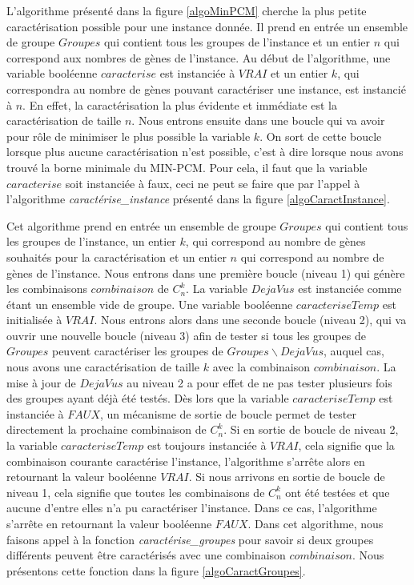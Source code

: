 L'algorithme présenté dans la figure \ref{algoMinPCM} cherche la plus petite caractérisation possible pour une instance donnée. Il prend en entrée un ensemble de groupe $Groupes$ qui contient tous les groupes de l'instance et un entier $n$ qui correspond aux nombres de gènes de l'instance. Au début de l'algorithme, une variable booléenne $caracterise$ est instanciée à $VRAI$ et un entier $k$, qui correspondra au nombre de gènes pouvant caractériser une instance, est instancié à $n$. En effet, la caractérisation la plus évidente et immédiate est la caractérisation de taille $n$. Nous entrons ensuite dans une boucle qui va avoir pour rôle de minimiser le plus possible la variable $k$. On sort de cette boucle lorsque plus aucune caractérisation n'est possible, c'est à dire lorsque nous avons trouvé la borne minimale du MIN-PCM. Pour cela, il faut que la variable $caracterise$ soit instanciée à faux, ceci ne peut se faire que par l'appel à l'algorithme \emph{caractérise\_instance} présenté dans la figure \ref{algoCaractInstance}.


Cet algorithme prend en entrée un ensemble de groupe $Groupes$ qui contient tous les groupes de l'instance, un entier $k$, qui correspond au nombre de gènes souhaités pour la caractérisation et un entier $n$ qui correspond au nombre de gènes de l'instance. Nous entrons dans une première boucle (niveau 1) qui génère les combinaisons $combinaison$ de $C_n^k$. La variable $DejaVus$ est instanciée comme étant un ensemble vide de groupe. Une variable booléenne $caracteriseTemp$ est initialisée à $VRAI$. Nous entrons alors dans une seconde boucle (niveau 2), qui va ouvrir une nouvelle boucle (niveau 3) afin de tester si tous les groupes de $Groupes$ peuvent caractériser les groupes de $Groupes \backslash DejaVus$, auquel cas, nous avons une caractérisation de taille $k$ avec la combinaison $combinaison$. La mise à jour de $DejaVus$ au niveau 2 a pour effet de ne pas tester plusieurs fois des groupes ayant déjà été testés. Dès lors que la variable $caracteriseTemp$ est instanciée à $FAUX$, un mécanisme de sortie de boucle permet de tester directement la prochaine combinaison de $C_n^k$. Si en sortie de boucle de niveau 2, la variable $caracteriseTemp$ est toujours instanciée à $VRAI$, cela signifie que la combinaison courante caractérise l'instance, l'algorithme s'arrête alors en retournant la valeur booléenne $VRAI$. Si nous arrivons en sortie de boucle de niveau 1, cela signifie que toutes les combinaisons de $C_n^k$ ont été testées et que aucune d'entre elles n'a pu caractériser l'instance. Dans ce cas, l'algorithme s'arrête en retournant la valeur booléenne $FAUX$. Dans cet algorithme, nous faisons appel à la fonction \emph{caractérise\_groupes} pour savoir si deux groupes différents peuvent être caractérisés avec une combinaison $combinaison$. Nous présentons cette fonction dans la figure \ref{algoCaractGroupes}.


